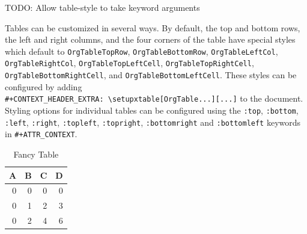 \documentclass[11pt]{article}
\begin{document}
TODO: Allow table-style to take keyword arguments

Tables can be customized in several ways. By default, the top and bottom rows,
the left and right columns, and the four corners of the table have special
styles which default to \texttt{OrgTableTopRow}, \texttt{OrgTableBottomRow},
\texttt{OrgTableLeftCol}, \texttt{OrgTableRightCol}, \texttt{OrgTableTopLeftCell},
\texttt{OrgTableTopRightCell}, \texttt{OrgTableBottomRightCell}, and
\texttt{OrgTableBottomLeftCell}. These styles can be configured by adding\\
\texttt{\#+CONTEXT\_HEADER\_EXTRA: \textbackslash{}setupxtable[OrgTable...][...]} to the document.
Styling options for individual tables can be configured using the
\texttt{:top}, \texttt{:bottom}, \texttt{:left}, \texttt{:right}, \texttt{:topleft}, \texttt{:topright}, \texttt{:bottomright}
and \texttt{:bottomleft} keywords in \texttt{\#+ATTR\_CONTEXT}.
\begin{table}[htbp]
\caption{Fancy Table}
\centering
\begin{tabular}{rrrr}
A & B & C & D\\
\hline
0 & 0 & 0 & 0\\
0 & 1 & 2 & 3\\
0 & 2 & 4 & 6\\
\end{tabular}
\end{table}
\end{document}
